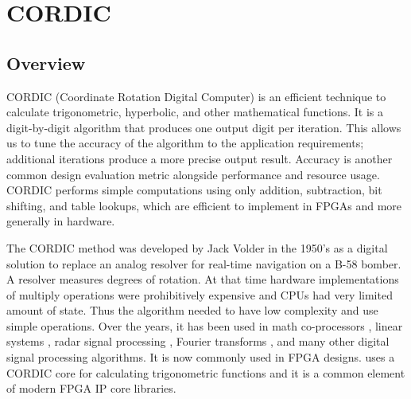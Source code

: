 
\chapter{CORDIC}
\glsresetall
\label{chapter:cordic}

\section{Overview}
\label{subsec:CORDIC_Overview}


CORDIC (Coordinate Rotation Digital Computer) is an efficient technique to calculate trigonometric, hyperbolic, and other mathematical functions. It is a digit-by-digit algorithm that produces one output digit per iteration. This allows us to tune the accuracy of the algorithm to the application requirements; additional iterations produce a more precise output result. Accuracy is another common design evaluation metric alongside performance and resource usage. CORDIC performs simple computations using only addition, subtraction, bit shifting, and table lookups, which are efficient to implement in FPGAs and more generally in hardware. 

\begin{aside}
The CORDIC method was developed by Jack Volder in the 1950's as a digital solution to replace an analog resolver for real-time navigation on a B-58 bomber. A resolver measures degrees of rotation. At that time hardware implementations of multiply operations were prohibitively expensive and CPUs had very limited amount of state. Thus the algorithm needed to have low complexity and use simple operations.  Over the years, it has been used in math co-processors \cite{duprat1993cordic}, linear systems \cite{ahmed1982highly}, radar signal processing \cite{andraka1996building}, Fourier transforms \cite{despain1974fourier}, and many other digital signal processing algorithms. It is now commonly used in FPGA designs. \VHLS uses a CORDIC core for calculating trigonometric functions and it is a common element of modern FPGA IP core libraries.
\end{aside}

